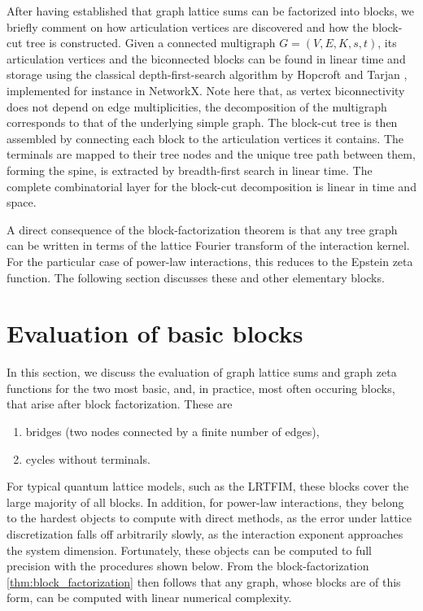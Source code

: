 \documentclass[]{amsart}
\numberwithin{mythm}{section}
\begin{document}
After having established that graph lattice sums can be factorized into blocks, we briefly comment on how articulation vertices are discovered and how the block-cut tree is constructed. Given a connected multigraph $G=(V,E,K,s,t)$, its articulation vertices and the biconnected blocks can be found in linear time and storage using the classical depth-first-search algorithm by Hopcroft and Tarjan \cite{Tarjan1972,HopcroftTarjan1973}, implemented for instance in NetworkX. Note here that, as vertex biconnectivity does not depend on edge multiplicities, the decomposition of the multigraph corresponds to that of the underlying simple graph. The block-cut tree is then assembled by connecting each block to the articulation vertices it contains. The terminals are mapped to their tree nodes and the unique tree path between them, forming the spine, is extracted by breadth-first search in linear time. The complete combinatorial layer for the block-cut decomposition is linear in time and space.

A direct consequence of the block-factorization theorem is that any tree graph can be written in terms of the lattice Fourier transform of the interaction kernel. For the particular case of power-law interactions, this reduces to the Epstein zeta function. The following section discusses these and other elementary blocks.

\section{Evaluation of basic blocks}
\label{sec:basic_blocks}

In this section, we discuss the evaluation of graph lattice sums and graph zeta functions for the two most basic, and, in practice, most often occuring blocks, that arise after block factorization. These are
\begin{enumerate}
    \item bridges (two nodes connected by a finite number of edges),
    \item cycles without terminals.
\end{enumerate}
For typical quantum lattice models, such as the LRTFIM, these blocks cover the large majority of all blocks. In addition, for power-law interactions, they belong to the hardest objects to compute with direct methods, as the error under lattice discretization falls off arbitrarily slowly, as the interaction exponent approaches the system dimension. Fortunately, these objects can be computed to full precision with the procedures shown below. From the block-factorization \cref{thm:block_factorization} then follows that any graph, whose blocks are of this form, can be computed with linear numerical complexity.
\end{document}
